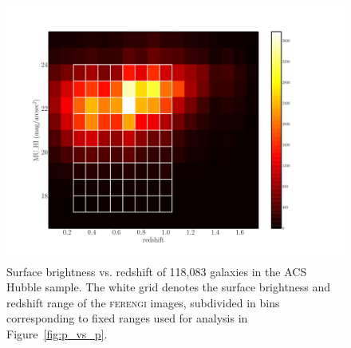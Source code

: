 \documentclass[usenatbib]{mn2e}
\newcommand{\ferengi}{\textsc{ferengi}}
\begin{document}
\begin{figure}
\begin{center}
\includegraphics[width=\textwidth]{figures/eye_of_sauron.pdf}
\caption{Surface brightness vs. redshift of 118,083 galaxies in the ACS Hubble sample. The white grid denotes the surface brightness and redshift range of the \ferengi{} images, subdivided in bins corresponding to fixed ranges used for analysis in Figure~\ref{fig:p_vs_p}.}

\label{fig:features_corrections}
\end{center}
\end{figure}
\end{document}

